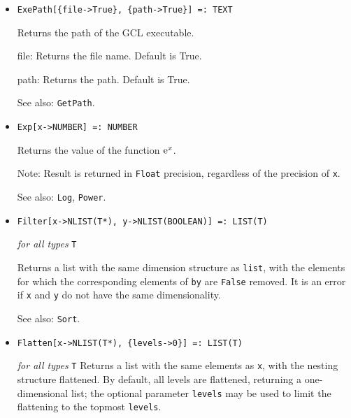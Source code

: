 \begin{itemize}
\item{}
\protect \large \begin{verbatim}
ExePath[{file->True}, {path->True}] =: TEXT 
\end{verbatim} \normalsize

\bd
Returns the path of the GCL executable. 
\bd
\item [file:] Returns the file name.  Default is True.  
\item [path:] Returns the path.  Default is True. 
\ed
\item [See also:] \verb+GetPath+.
\ed

\item{}
\protect \large \begin{verbatim}
Exp[x->NUMBER] =: NUMBER 
\end{verbatim} \normalsize

\bd
Returns the value of the function ${\rm e}^{x}$.
\item [Note:] Result is returned in \verb+Float+ precision, regardless
of the precision of \verb+x+.
\item [See also:] \verb+Log+, \verb+Power+.
\ed



\item{}
\protect \large \begin{verbatim}
Filter[x->NLIST(T*), y->NLIST(BOOLEAN)] =: LIST(T)
\end{verbatim} \normalsize

{\it for all types} {\tt T}

\bd
Returns a list with the same dimension structure as \verb+list+, with the
elements for which the corresponding elements of \verb+by+ are \verb+False+
removed.  It is an error if \verb+x+ and \verb+y+ do not have the same
dimensionality.
\item [See also:] \verb+Sort+.
\ed

\item{}
\protect \large \begin{verbatim}
Flatten[x->NLIST(T*), {levels->0}] =: LIST(T) 
\end{verbatim} \normalsize

{\it for all types} {\tt T}
\bd
Returns a list with the same elements as \verb+x+, with the nesting
structure flattened.  By default, all levels are flattened, returning
a one-dimensional list; the optional parameter \verb+levels+ may be
used to limit the flattening to the topmost \verb+levels+.
\ed


\end{itemize}
